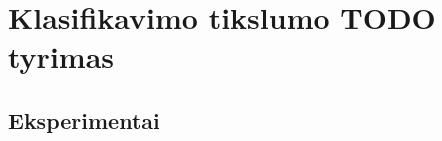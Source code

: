 \section{Klasifikavimo tikslumo TODO tyrimas}\label{sec:experiments}



\clearpage
\subsection{Eksperimentai}

\clearpage

\clearpage

\clearpage

